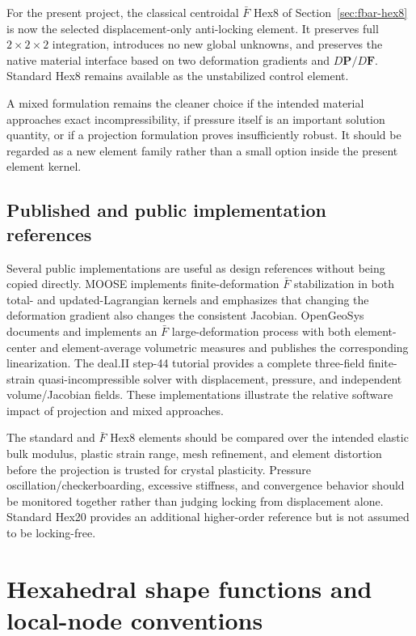 \documentclass[11pt,a4paper]{article}
\newcommand{\bs}[1]{\boldsymbol{#1}}
\newcommand{\F}{\bs{F}}
\newcommand{\Pstress}{\bs{P}}
\begin{document}
For the present project, the classical centroidal $\bar F$ Hex8 of Section~\ref{sec:fbar-hex8} is now the selected displacement-only anti-locking element. It preserves full $2\times2\times2$ integration, introduces no new global unknowns, and preserves the native material interface based on two deformation gradients and $D\Pstress/D\F$. Standard Hex8 remains available as the unstabilized control element.



A mixed formulation remains the cleaner choice if the intended material approaches exact incompressibility, if pressure itself is an important solution quantity, or if a projection formulation proves insufficiently robust. It should be regarded as a new element family rather than a small option inside the present element kernel.

\subsection{Published and public implementation references}

Several public implementations are useful as design references without being copied directly. MOOSE implements finite-deformation $\bar F$ stabilization in both total- and updated-Lagrangian kernels and emphasizes that changing the deformation gradient also changes the consistent Jacobian. OpenGeoSys documents and implements an $\bar F$ large-deformation process with both element-center and element-average volumetric measures and publishes the corresponding linearization. The deal.II step-44 tutorial provides a complete three-field finite-strain quasi-incompressible solver with displacement, pressure, and independent volume/Jacobian fields. These implementations illustrate the relative software impact of projection and mixed approaches.

The standard and $\bar F$ Hex8 elements should be compared over the intended elastic bulk modulus, plastic strain range, mesh refinement, and element distortion before the projection is trusted for crystal plasticity. Pressure oscillation/checkerboarding, excessive stiffness, and convergence behavior should be monitored together rather than judging locking from displacement alone. Standard Hex20 provides an additional higher-order reference but is not assumed to be locking-free.

\section{Hexahedral shape functions and local-node conventions}
\label{app:shape-functions}
\end{document}
